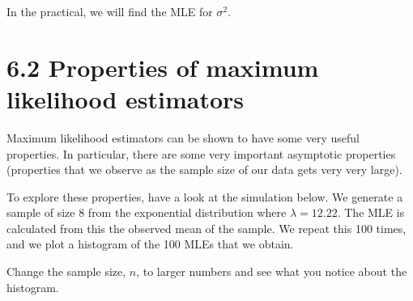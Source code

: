 \documentclass[letterpaper,10pt,english]{jupyterBook}
\begin{document}
\sphinxAtStartPar
In the practical, we will find the MLE for \(\sigma^2\).


\section{6.2 Properties of maximum likelihood estimators}
\label{\detokenize{06.c. Maximum Likelihood:properties-of-maximum-likelihood-estimators}}\label{\detokenize{06.c. Maximum Likelihood::doc}}
\sphinxAtStartPar
Maximum likelihood estimators can be shown to have some very useful properties. In particular, there are some very important asymptotic properties (properties that we observe as the sample size of our data gets very very large).

\sphinxAtStartPar
To explore these properties, have a look at the simulation below. We generate a sample of size 8 from the exponential distribution where \(\lambda=12.22\). The MLE is calculated from this the observed mean of the sample. We repeat this 100 times, and we plot a histogram of the 100 MLEs that we obtain.

\sphinxAtStartPar
Change the sample size, \(n\), to larger numbers and see what you notice about the histogram.

\begin{sphinxVerbatim}[commandchars=\\\{\}]
    

   

  
     
  \PYG{p}{[}\PYG{p}{]}  

 
  
       
 
\end{sphinxVerbatim}
\end{document}
